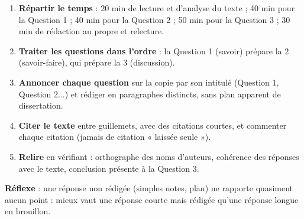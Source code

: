 \documentclass[11pt]{article}
\begin{document}
\begin{methode}
\begin{enumerate}
\item \textbf{Répartir le temps} : 20 min de lecture et d'analyse du texte ; 40 min pour la Question 1 ; 40 min pour la Question 2 ; 50 min pour la Question 3 ; 30 min de rédaction au propre et relecture.
\item \textbf{Traiter les questions dans l'ordre} : la Question 1 (savoir) prépare la 2 (savoir-faire), qui prépare la 3 (discussion).
\item \textbf{Annoncer chaque question} sur la copie par son intitulé (Question 1, Question 2...) et rédiger en paragraphes distincts, sans plan apparent de dissertation.
\item \textbf{Citer le texte} entre guillemets, avec des citations courtes, et commenter chaque citation (jamais de citation « laissée seule »).
\item \textbf{Relire} en vérifiant : orthographe des noms d'auteurs, cohérence des réponses avec le texte, conclusion présente à la Question 3.
\end{enumerate}
\textbf{Réflexe} : une réponse non rédigée (simples notes, plan) ne rapporte quasiment aucun point : mieux vaut une réponse courte mais rédigée qu'une réponse longue en brouillon.
\end{methode}
\end{document}
